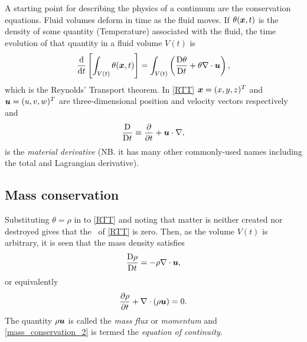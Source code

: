 A starting point for describing the physics of a continuum are the conservation equations. Fluid volumes deform in time as the fluid moves. If $\theta({\mbox{\boldmath$x$}},t)$ is the density of some quantity (\eg Temperature) associated with the fluid, the time evolution of that quantity in a fluid volume $V(t)$ is 
\begin{equation}\label{RTT}
 \frac{\mathrm{d}}{\mathrm{d} t}\left[\int_{V(t)}\theta({\mbox{\boldmath$x$}},t)\right]=
 \int_{V(t)}\left(\frac{\mathrm{D}\theta}{\mathrm{D} t}+\theta\nabla\cdot{\mbox{\boldmath$u$}}\right),
\end{equation}
which is the Reynolds' Transport theorem. In \eqref{RTT} ${\mbox{\boldmath$x$}}=(x,y,z)^T$ and ${\mbox{\boldmath$u$}}=(u,v,w)^T$ are three-dimensional position and velocity vectors respectively and 
\begin{equation}\label{MatDiv}
 \frac{\mathrm{D}}{\mathrm{D} t}\equiv\frac{\partial}{\partial{t}}+{\mbox{\boldmath$u$}}\cdot\nabla,
\end{equation}
is the \textit{material derivative} (NB. it has many other commonly-used names including the total and Lagrangian derivative). 

\subsection{Mass conservation}
Substituting $\theta=\rho$ in to \eqref{RTT} and noting that matter is neither created nor destroyed gives that the \lhs\ of \eqref{RTT} is zero. Then, as the volume $V(t)$ is arbitrary, it is seen that the mass density satisfies
\begin{equation}\label{mass_conservation}
 \frac{\mathrm{D}\rho}{\mathrm{D} t}=-\rho\nabla\cdot{\mbox{\boldmath$u$}},
\end{equation}
or equivalently
\begin{equation}\label{mass_conservation_2}
 \frac{\partial\rho}{\partial{t}}+\nabla\cdot(\rho{\mbox{\boldmath$u$}})=0.
\end{equation}
The quantity $\rho{\mbox{\boldmath$u$}}$ is called the \textit{mass flux} or \textit{momentum} and \eqref{mass_conservation_2} is termed the \textit{equation of continuity}.

